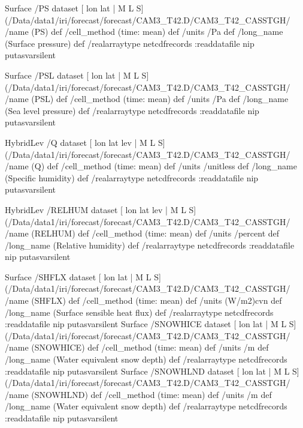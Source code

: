 \begin{ingrid}
Surface /PS{
dataset
[ lon lat | M L S] (/Data/data1/iri/forecast/forecast/CAM3_T42.D/CAM3_T42_CASSTGH/%
/name (PS) def
 /cell_method (time: mean) def
 /units /Pa def
 /long_name (Surface pressure) def
 /realarraytype netcdfrecords :readdatafile
nip
}putasvarsilent

Surface /PSL{
dataset
[ lon lat | M L S] (/Data/data1/iri/forecast/forecast/CAM3_T42.D/CAM3_T42_CASSTGH/%
/name (PSL) def
 /cell_method (time: mean) def
 /units /Pa def
 /long_name (Sea level pressure) def
 /realarraytype netcdfrecords :readdatafile
nip
}putasvarsilent


HybridLev /Q{
dataset
[ lon lat lev | M L S] (/Data/data1/iri/forecast/forecast/CAM3_T42.D/CAM3_T42_CASSTGH/%
/name (Q) def
 /cell_method (time: mean) def
 /units /unitless def
 /long_name (Specific humidity) def
 /realarraytype netcdfrecords :readdatafile
nip
}putasvarsilent

HybridLev /RELHUM{
dataset
[ lon lat lev | M L S] (/Data/data1/iri/forecast/forecast/CAM3_T42.D/CAM3_T42_CASSTGH/%
/name (RELHUM) def
 /cell_method (time: mean) def
 /units /percent def
 /long_name (Relative humidity) def
 /realarraytype netcdfrecords :readdatafile
nip
}putasvarsilent


Surface /SHFLX{
dataset
[ lon lat | M L S] (/Data/data1/iri/forecast/forecast/CAM3_T42.D/CAM3_T42_CASSTGH/%
/name (SHFLX) def
 /cell_method (time: mean) def
 /units (W/m2)cvn def
 /long_name (Surface sensible heat flux) def
 /realarraytype netcdfrecords :readdatafile
nip
}putasvarsilent
Surface /SNOWHICE{
dataset
[ lon lat | M L S] (/Data/data1/iri/forecast/forecast/CAM3_T42.D/CAM3_T42_CASSTGH/%
/name (SNOWHICE) def
 /cell_method (time: mean) def
 /units /m def
 /long_name (Water equivalent snow depth) def
 /realarraytype netcdfrecords :readdatafile
nip
}putasvarsilent
Surface /SNOWHLND{
dataset
[ lon lat | M L S] (/Data/data1/iri/forecast/forecast/CAM3_T42.D/CAM3_T42_CASSTGH/%
/name (SNOWHLND) def
 /cell_method (time: mean) def
 /units /m def
 /long_name (Water equivalent snow depth) def
 /realarraytype netcdfrecords :readdatafile
nip
}putasvarsilent



\end{ingrid}
